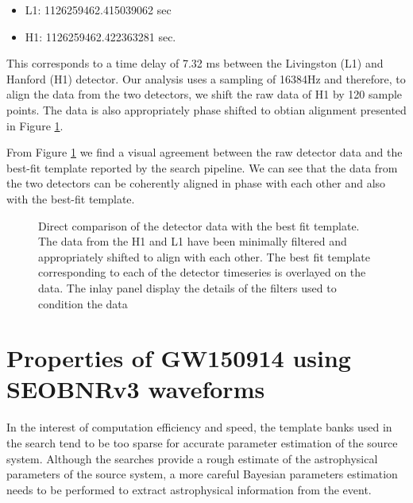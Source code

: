 \begin{itemize}
\item L1: 1126259462.415039062 sec
\item H1: 1126259462.422363281 sec.  
\end{itemize}

This corresponds to a time delay of 7.32 ms between the Livingston (L1) and Hanford (H1) detector. Our analysis uses a sampling of 16384Hz and therefore, to align the data from the two detectors, we shift the raw data of H1 by 120 sample points. The data is also appropriately phase shifted to obtian alignment presented in Figure \ref{fig:overlayGW150914}.

From Figure \ref{fig:overlayGW150914} we find a visual agreement between the raw detector data and the best-fit template reported by the search pipeline. We can see that the data from the two detectors can be coherently aligned in phase with each other and also with the best-fit template. 

\begin{figure}
\caption{Direct comparison of the detector data with the best fit template. The data from the H1 and L1 have been minimally filtered and  appropriately shifted to align with each other. The best fit template corresponding to each of the detector timeseries is overlayed on the data. The inlay panel display the details of the filters used to condition the data}
\label{fig:overlayGW150914}
\end{figure}

\section{Properties of GW150914 using SEOBNRv3 waveforms}
\label{sec:prop-GW150914}
In the interest of computation efficiency and speed, the template banks used in the search tend to be too sparse for accurate parameter estimation of the source system.
Although the searches provide a rough estimate of the astrophysical parameters of the source system, a more careful Bayesian parameters estimation needs to be performed to extract astrophysical information from the event.   

